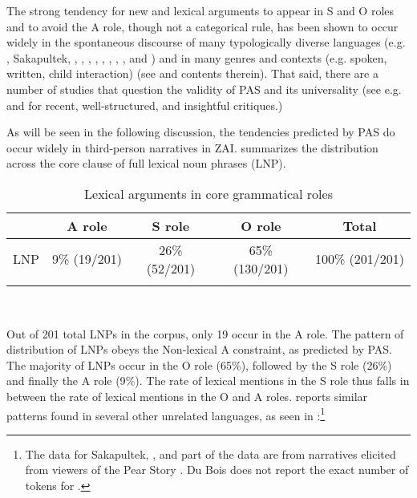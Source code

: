 The strong tendency for new and lexical arguments to appear in S and O roles and to avoid the A role, though not a categorical rule, has been shown to occur widely in the spontaneous discourse of many typologically diverse languages (e.g. , Sakapultek, , , , , , , , ,  and ) and in many genres and contexts (e.g. spoken, written, child interaction) (see \citealt{dubois2003} and contents therein). That said, there are a number of studies that question the validity of PAS and its universality (see e.g. \citealt{haig2016} and \citealt{schnell2017} for recent, well-structured, and insightful critiques.)

As will be seen in the following discussion, the tendencies predicted by PAS do occur widely in third-person narratives in ZAI.  summarizes the distribution across the core clause of full lexical noun phrases (LNP).


\begin{table} 

\caption{{Lexical arguments in core grammatical roles}}
\begin{tabular}{ l  c  c  c  c }
\lsptoprule
 & A role & S role & O role &  {Total} \\

\midrule
 \textsc{LNP} & 9{\%} (19/201) & 26{\%}(52/201) & 65{\%} (130/201) & 100{\%} (201/201) \\
  
\lspbottomrule
\end{tabular}\\
\label{generaldist} 
\end{table}

Out of 201 total LNPs in the corpus, only 19 occur in the A role. The pattern of distribution of LNPs obeys the Non-lexical A constraint, as predicted by PAS. The majority of LNPs occur in the O role (65{\%}), followed by the S role (26{\%}) and finally the A role (9{\%}).  The rate of lexical mentions in the S role thus falls in between the rate of lexical mentions in the O and A roles. \citet[37]{dubois2003b} reports similar patterns found in several other unrelated languages, as seen in :\footnote{The data for Sakapultek, ,  and part of the  data are from narratives elicited from viewers of the Pear Story \citep[62-63]{dubois2003a}. Du Bois does not report the exact number of tokens for .}


